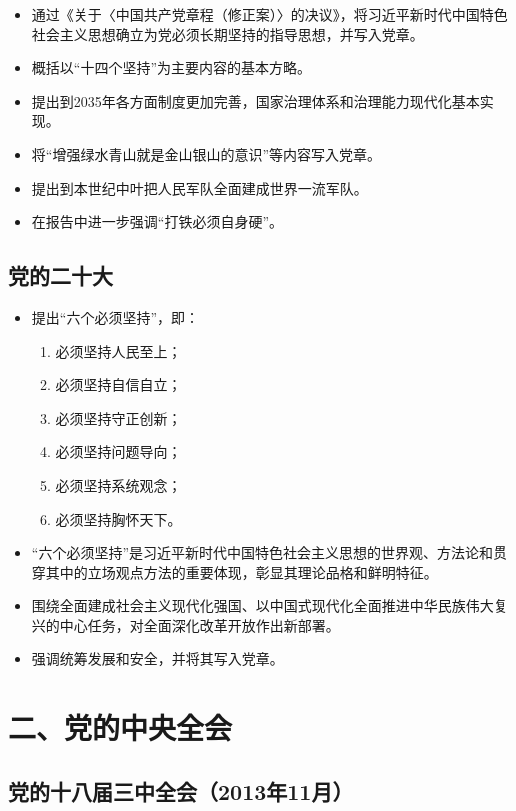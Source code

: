 \documentclass[12pt,a4paper]{ctexart}
\begin{document}
\begin{itemize}
\item 通过《关于〈中国共产党章程（修正案）〉的决议》，将习近平新时代中国特色社会主义思想确立为党必须长期坚持的指导思想，并写入党章。
\item 概括以“十四个坚持”为主要内容的基本方略。
\item 提出到2035年各方面制度更加完善，国家治理体系和治理能力现代化基本实现。
\item 将“增强绿水青山就是金山银山的意识”等内容写入党章。
\item 提出到本世纪中叶把人民军队全面建成世界一流军队。
\item 在报告中进一步强调“打铁必须自身硬”。
\end{itemize}

\subsection*{党的二十大}

\begin{itemize}
\item 提出“六个必须坚持”，即：
\begin{enumerate}
\item 必须坚持人民至上；
\item 必须坚持自信自立；
\item 必须坚持守正创新；
\item 必须坚持问题导向；
\item 必须坚持系统观念；
\item 必须坚持胸怀天下。
\end{enumerate}
\item “六个必须坚持”是习近平新时代中国特色社会主义思想的世界观、方法论和贯穿其中的立场观点方法的重要体现，彰显其理论品格和鲜明特征。
\item 围绕全面建成社会主义现代化强国、以中国式现代化全面推进中华民族伟大复兴的中心任务，对全面深化改革开放作出新部署。
\item 强调统筹发展和安全，并将其写入党章。
\end{itemize}

\section*{二、党的中央全会}

\subsection*{党的十八届三中全会（2013年11月）}
\end{document}
